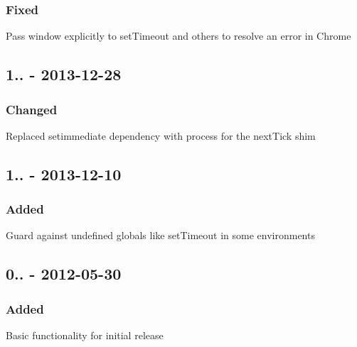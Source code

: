 \subsubsection*{Fixed}


\begin{DoxyItemize}
\item Pass {\ttfamily window} explicitly to {\ttfamily set\+Timeout} and others to resolve an error in Chrome
\end{DoxyItemize}

\subsection*{1.. -\/ 2013-\/12-\/28}

\subsubsection*{Changed}


\begin{DoxyItemize}
\item Replaced {\ttfamily setimmediate} dependency with {\ttfamily process} for the {\ttfamily next\+Tick} shim
\end{DoxyItemize}

\subsection*{1.. -\/ 2013-\/12-\/10}

\subsubsection*{Added}


\begin{DoxyItemize}
\item Guard against undefined globals like {\ttfamily set\+Timeout} in some environments
\end{DoxyItemize}

\subsection*{0.. -\/ 2012-\/05-\/30}

\subsubsection*{Added}


\begin{DoxyItemize}
\item Basic functionality for initial release 
\end{DoxyItemize}